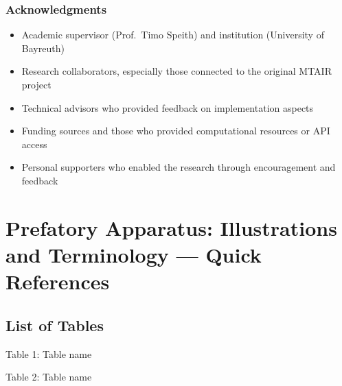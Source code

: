 \documentclass[
  11pt,
  letterpaper,
]{book}
\providecommand{\tightlist}{%
  \setlength{\itemsep}{0pt}\setlength{\parskip}{0pt}}
\begin{document}

\subsection*{\texorpdfstring{\textbf{Acknowledgments}}{Acknowledgments}}\label{acknowledgments}

\begin{itemize}
\tightlist
\item
  Academic supervisor (Prof.~Timo Speith) and institution (University of
  Bayreuth)\\
\item
  Research collaborators, especially those connected to the original
  MTAIR project\\
\item
  Technical advisors who provided feedback on implementation aspects\\
\item
  Funding sources and those who provided computational resources or API
  access\\
\item
  Personal supporters who enabled the research through encouragement and
  feedback
\end{itemize}


\chapter*{Prefatory Apparatus: Illustrations and Terminology --- Quick
References}\label{prefatory-apparatus-illustrations-and-terminology-quick-references}


\section*{List of Tables}\label{list-of-tables}


Table 1: Table name

Table 2: Table name
\end{document}
